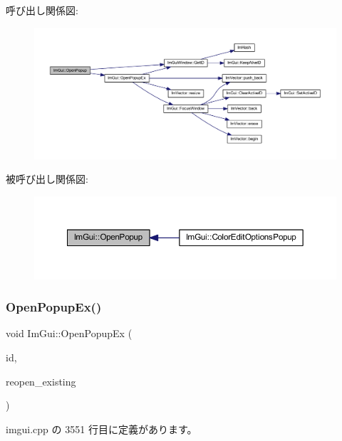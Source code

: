 呼び出し関係図\+:\nopagebreak
\begin{figure}[H]
\begin{center}
\leavevmode
\includegraphics[width=350pt]{namespace_im_gui_a9576648c40b92f54b671e2e51654dd2c_cgraph}
\end{center}
\end{figure}
被呼び出し関係図\+:\nopagebreak
\begin{figure}[H]
\begin{center}
\leavevmode
\includegraphics[width=350pt]{namespace_im_gui_a9576648c40b92f54b671e2e51654dd2c_icgraph}
\end{center}
\end{figure}
\mbox{\label{namespace_im_gui_a92683a696319581577334d6b798e2f97}} 
\subsubsection{\texorpdfstring{Open\+Popup\+Ex()}{OpenPopupEx()}}
{\footnotesize\ttfamily void Im\+Gui\+::\+Open\+Popup\+Ex (\begin{DoxyParamCaption}\item[{\mbox{\hyperlink{imgui_8h_a1785c9b6f4e16406764a85f32582236f}{Im\+Gui\+ID}}}]{id,  }\item[{bool}]{reopen\+\_\+existing }\end{DoxyParamCaption})}



 imgui.\+cpp の 3551 行目に定義があります。

